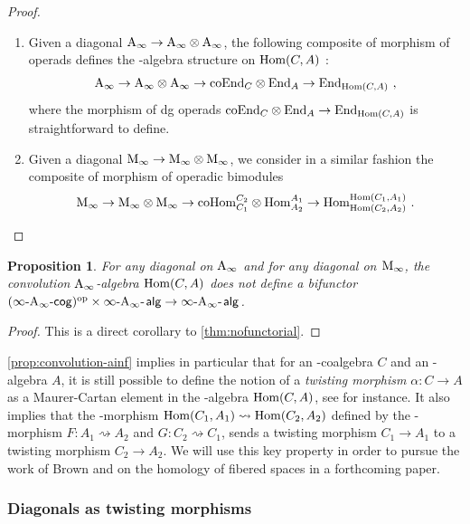 \documentclass[10pt]{amsart}
\newtheorem{proposition}[definition]{Proposition}
\theoremstyle{remark}
\begin{document}
\begin{proof} $ $
\begin{enumerate}[leftmargin=*]
\item Given a diagonal $\mathrm{A}_\infty \rightarrow \mathrm{A}_\infty \otimes \mathrm{A}_\infty$, the following composite of morphism of operads defines the \Ainf -algebra structure on $\mathrm{Hom}(C,A)$ : 
\[ \mathrm{A}_\infty \to \mathrm{A}_\infty \otimes \mathrm{A}_\infty \to \mathrm{coEnd}_C\otimes \mathrm{End}_A \to \mathrm{End}_{\mathrm{Hom}(C,A)} \ , \]
where the morphism of dg operads $\mathrm{coEnd}_C \otimes \mathrm{End}_A \to \mathrm{End}_{\mathrm{Hom}(C,A)}$ is straightforward to define.
\item Given a diagonal $\mathrm{M}_\infty \rightarrow \mathrm{M}_\infty \otimes \mathrm{M}_\infty$, we consider in a similar fashion the composite of morphism of operadic bimodules
\[ \mathrm{M}_\infty \to \mathrm{M}_\infty \otimes \mathrm{M}_\infty \to \mathrm{coHom}^{C_2}_{C_1} \otimes \mathrm{Hom}^{A_1}_{A_2} \to \mathrm{Hom}^{\mathrm{Hom}(C_1,A_1)}_{\mathrm{Hom}(C_2, A_2)} \ . \] 
\end{enumerate}
\end{proof}

\begin{proposition}
  \label{coroll:nobifunctor}
For any diagonal on $\mathrm{A}_\infty$ and for any diagonal on $\mathrm{M}_\infty$, the convolution $\mathrm{A}_\infty$-algebra $\mathrm{Hom}(C,A)$ does not define a bifunctor $(\infty\text{-}\mathrm{A}_\infty\text{-}\mathsf{cog})^{\mathrm{op}} \times \infty\text{-}\mathrm{A}_\infty\text{-\hspace{1pt}}\mathsf{alg} \rightarrow \infty\text{-}\mathrm{A}_\infty\text{-\hspace{1pt}}\mathsf{alg}$.
\end{proposition}
\begin{proof}
  This is a direct corollary to \cref{thm:nofunctorial}.
\end{proof}

\cref{prop:convolution-ainf} implies in particular that for an \Ainf -coalgebra $C$ and an \Ainf -algebra $A$, it is still possible to define the notion of a \textit{twisting morphism} $\alpha : C \rightarrow A$ as a Maurer-Cartan element in the \Ainf -algebra $\mathrm{Hom} (C,A)$, see \cite[Equation (4.1), p.72]{dotsenko2018twisting} for instance.
It also implies that the \Ainf -morphism $\mathrm{Hom} (C_1,A_1) \rightsquigarrow \mathrm{Hom} (C_2,A_2)$ defined by the \Ainf -morphism $F : A_1 \rightsquigarrow A_2$ and $G : C_2 \rightsquigarrow C_1$, sends a twisting morphism $C_1 \rightarrow A_1$ to a twisting morphism $C_2 \rightarrow A_2$.
We will use this key property in order to pursue the work of Brown \cite{Brown59} and \cite{Proute86} on the homology of fibered spaces in a forthcoming paper.

\subsubsection{Diagonals as twisting morphisms}
\label{sec:RNW}
\end{document}
